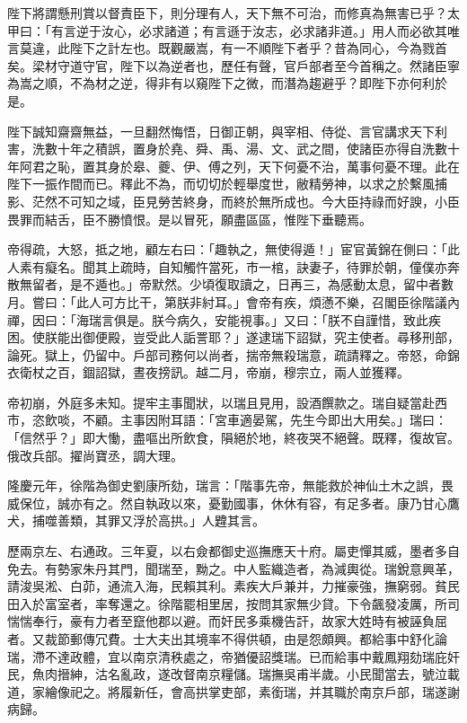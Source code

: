 \begin{pinyinscope}
陛下將謂懸刑賞以督責臣下，則分理有人，天下無不可治，而修真為無害已乎？太甲曰：「有言逆于汝心，必求諸道；有言遜于汝志，必求諸非道。」用人而必欲其唯言莫違，此陛下之計左也。既觀嚴嵩，有一不順陛下者乎？昔為同心，今為戮首矣。梁材守道守官，陛下以為逆者也，歷任有聲，官戶部者至今首稱之。然諸臣寧為嵩之順，不為材之逆，得非有以窺陛下之微，而潛為趨避乎？即陛下亦何利於是。

陛下誠知齋齋無益，一旦翻然悔悟，日御正朝，與宰相、侍從、言官講求天下利害，洗數十年之積誤，置身於堯、舜、禹、湯、文、武之間，使諸臣亦得自洗數十年阿君之恥，置其身於皋、夔、伊、傅之列，天下何憂不治，萬事何憂不理。此在陛下一振作間而已。釋此不為，而切切於輕舉度世，敝精勞神，以求之於繫風捕影、茫然不可知之域，臣見勞苦終身，而終於無所成也。今大臣持祿而好諛，小臣畏罪而結舌，臣不勝憤恨。是以冒死，願盡區區，惟陛下垂聽焉。

帝得疏，大怒，抵之地，顧左右曰：「趣執之，無使得遁！」宦官黃錦在側曰：「此人素有癡名。聞其上疏時，自知觸忤當死，市一棺，訣妻子，待罪於朝，僮僕亦奔散無留者，是不遁也。」帝默然。少頃復取讀之，日再三，為感動太息，留中者數月。嘗曰：「此人可方比干，第朕非紂耳。」會帝有疾，煩懣不樂，召閣臣徐階議內禪，因曰：「海瑞言俱是。朕今病久，安能視事。」又曰：「朕不自謹惜，致此疾困。使朕能出御便殿，豈受此人詬詈耶？」遂逮瑞下詔獄，究主使者。尋移刑部，論死。獄上，仍留中。戶部司務何以尚者，揣帝無殺瑞意，疏請釋之。帝怒，命錦衣衛杖之百，錮詔獄，晝夜搒訊。越二月，帝崩，穆宗立，兩人並獲釋。

帝初崩，外庭多未知。提牢主事聞狀，以瑞且見用，設酒饌款之。瑞自疑當赴西市，恣飲啖，不顧。主事因附耳語：「宮車適晏駕，先生今即出大用矣。」瑞曰：「信然乎？」即大慟，盡嘔出所飲食，隕絕於地，終夜哭不絕聲。既釋，復故官。俄改兵部。擢尚寶丞，調大理。

隆慶元年，徐階為御史劉康所劾，瑞言：「階事先帝，無能救於神仙土木之誤，畏威保位，誠亦有之。然自執政以來，憂勤國事，休休有容，有足多者。康乃甘心鷹犬，捕噬善類，其罪又浮於高拱。」人韙其言。

歷兩京左、右通政。三年夏，以右僉都御史巡撫應天十府。屬吏憚其威，墨者多自免去。有勢家朱丹其門，聞瑞至，黝之。中人監織造者，為減輿從。瑞銳意興革，請浚吳淞、白茆，通流入海，民賴其利。素疾大戶兼并，力摧豪強，撫窮弱。貧民田入於富室者，率奪還之。徐階罷相里居，按問其家無少貸。下令飆發凌厲，所司惴惴奉行，豪有力者至竄他郡以避。而奸民多乘機告訐，故家大姓時有被誣負屈者。又裁節郵傳冗費。士大夫出其境率不得供頓，由是怨頗興。都給事中舒化論瑞，滯不達政體，宜以南京清秩處之，帝猶優詔獎瑞。已而給事中戴鳳翔劾瑞庇奸民，魚肉搢紳，沽名亂政，遂改督南京糧儲。瑞撫吳甫半歲。小民聞當去，號泣載道，家繪像祀之。將履新任，會高拱掌吏部，素銜瑞，并其職於南京戶部，瑞遂謝病歸。


\end{pinyinscope}
